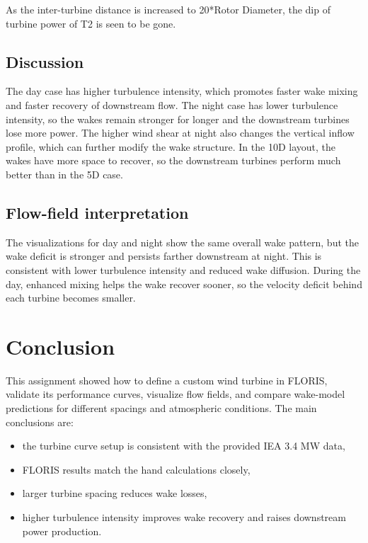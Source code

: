 \documentclass[11pt,a4paper]{article}
\begin{document}
	As the inter-turbine distance is increased to 20*Rotor Diameter, the dip of turbine power of T2 is seen to be gone.
	
	\subsection{Discussion}
	The day case has higher turbulence intensity, which promotes faster wake mixing and faster recovery of downstream flow. The night case has lower turbulence intensity, so the wakes remain stronger for longer and the downstream turbines lose more power. The higher wind shear at night also changes the vertical inflow profile, which can further modify the wake structure. In the 10D layout, the wakes have more space to recover, so the downstream turbines perform much better than in the 5D case.
	
	\subsection{Flow-field interpretation}
	The visualizations for day and night show the same overall wake pattern, but the wake deficit is stronger and persists farther downstream at night. This is consistent with lower turbulence intensity and reduced wake diffusion. During the day, enhanced mixing helps the wake recover sooner, so the velocity deficit behind each turbine becomes smaller.
	
	\section{Conclusion}
	This assignment showed how to define a custom wind turbine in FLORIS, validate its performance curves, visualize flow fields, and compare wake-model predictions for different spacings and atmospheric conditions. The main conclusions are:
	\begin{itemize}[leftmargin=1.2em]
		\item the turbine curve setup is consistent with the provided IEA 3.4 MW data,
		\item FLORIS results match the hand calculations closely,
		\item larger turbine spacing reduces wake losses,
		\item higher turbulence intensity improves wake recovery and raises downstream power production.
	\end{itemize}
	
\end{document}
